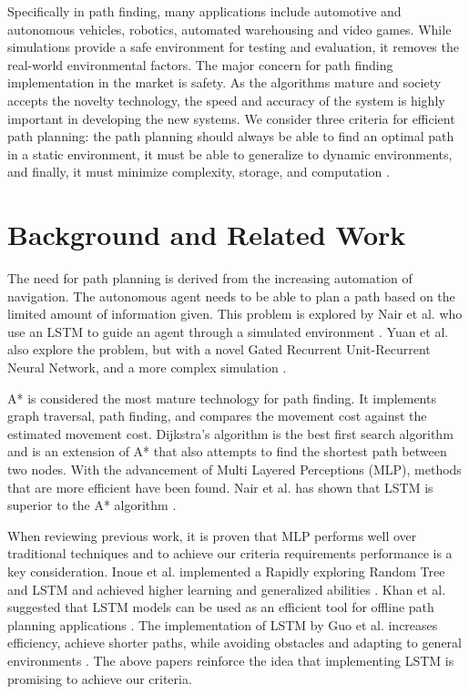 \documentclass[conference]{IEEEtran}
\begin{document}
Specifically in path finding, many applications include automotive and
autonomous vehicles, robotics, automated warehousing and video games. While
simulations provide a safe environment for testing and evaluation, it removes
the real-world environmental factors. The major concern for path finding
implementation in the market is safety. As the algorithms mature and society
accepts the novelty technology, the speed and accuracy of the system is highly
important in developing the new systems. We consider three criteria for
efficient path planning: the path planning should always be able to find an
optimal path in a static environment, it must be able to generalize to dynamic
environments, and finally, it must minimize complexity, storage, and computation
\cite{janet_essential_1995}.

\section{Background and Related Work}
The need for path planning is derived from the increasing automation of
navigation. The autonomous agent needs to be able to plan a path based on the
limited amount of information given. This problem is explored by Nair et al. who
use an LSTM to guide an agent through a simulated environment
\cite{nair_robotic_2020}. Yuan et al. also explore the problem, but with a novel
Gated Recurrent Unit-Recurrent Neural Network, and a more complex simulation
\cite{yuan_novel_2019}.

A* is considered the most mature technology for path finding.  It implements
graph traversal, path finding, and compares the movement cost against the
estimated movement cost.  Dijkstra's algorithm is the best first search
algorithm and is an extension of A* that also attempts to find the shortest path
between two nodes.  With the advancement of Multi Layered Perceptions (MLP),
methods that are more efficient have been found. Nair et al. has shown that LSTM
is superior to the A* algorithm \cite{nair_robotic_2020}.

When reviewing previous work, it is proven that MLP performs well over
traditional techniques and to achieve our criteria requirements performance is a
key consideration. Inoue et al. implemented a Rapidly exploring Random Tree and
LSTM and achieved higher learning and generalized abilities
\cite{inoue_robot_2019}. Khan et al. suggested that LSTM models can be used as
an efficient tool for offline path planning applications \cite{khan_using_2017}.
The implementation of LSTM by Guo et al. increases efficiency, achieve shorter
paths, while avoiding obstacles and adapting to general environments
\cite{guo_fusion_2021}. The above papers reinforce the idea that implementing
LSTM is promising to achieve our criteria.
\end{document}
